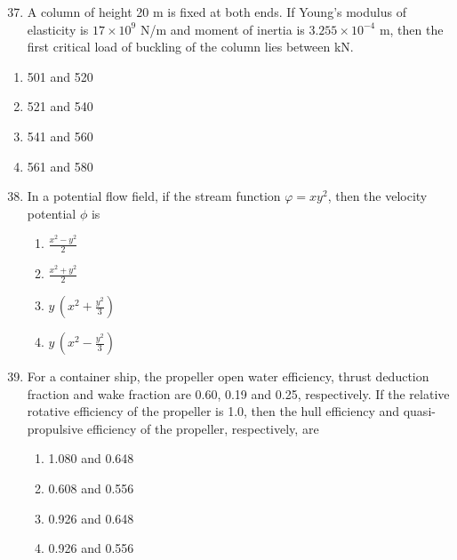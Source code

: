 \documentclass[journal]{IEEEtran}
\theoremstyle{remark}
\begin{document}
\begin{enumerate}[itemsep=1em]
\setcounter{enumi}{36}
\item A column of height 20 m is fixed at both ends. If Young's modulus of elasticity is $17\times 10^9$ N/m  and moment of inertia is $3.255\times 10^{-4}$ m, then the first critical load of buckling of the column lies between \underline{\hspace{2cm}} kN. 
\end{enumerate}

\begin{multicols}{4}
\begin{enumerate}
    \item 501 and 520 
    \item 521 and 540
    \item 541 and 560 
    \item 561 and 580 
\end{enumerate}
\end{multicols}

\begin{enumerate}[itemsep=1em]
\setcounter{enumi}{37}
\item In a potential flow field, if the stream function $\varphi=xy^2$, then the velocity potential $\phi$ is 
\begin{multicols}{4}
\begin{enumerate}
    \item $\frac{x^2-y^2}{2}$
    \item $\frac{x^2+y^2}{2}$
    \item $y\,(x^2+\frac{y^2}{3})$
    \item $y\,(x^2-\frac{y^2}{3})$
\end{enumerate}
\end{multicols}
\end{enumerate}

\begin{enumerate}[itemsep=1em]
\setcounter{enumi}{38}
\item For a container ship, the propeller open water efficiency, thrust deduction fraction and wake fraction are 0.60, 0.19 and 0.25, respectively. If the relative rotative efficiency of the propeller is 1.0, then the hull efficiency and quasi-propulsive efficiency of the propeller, respectively, are 
\begin{multicols}{4}
\begin{enumerate}
    \item 1.080 and 0.648
    \item 0.608 and 0.556 
    \item 0.926 and 0.648
    \item 0.926 and 0.556 
\end{enumerate}
\end{multicols}
\end{enumerate}
\end{document}
